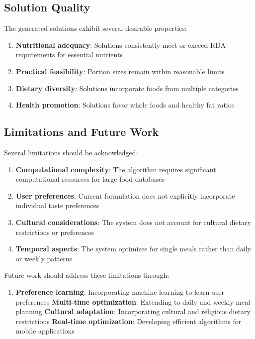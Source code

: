\documentclass[12pt,a4paper]{article}
\begin{document}
\subsection{Solution Quality}

The generated solutions exhibit several desirable properties:

\begin{enumerate}
    \item \textbf{Nutritional adequacy}: Solutions consistently meet or exceed RDA requirements for essential nutrients
    \item \textbf{Practical feasibility}: Portion sizes remain within reasonable limits
    \item \textbf{Dietary diversity}: Solutions incorporate foods from multiple categories
    \item \textbf{Health promotion}: Solutions favor whole foods and healthy fat ratios
\end{enumerate}

\subsection{Limitations and Future Work}

Several limitations should be acknowledged:

\begin{enumerate}
    \item \textbf{Computational complexity}: The algorithm requires significant computational resources for large food databases
    \item \textbf{User preferences}: Current formulation does not explicitly incorporate individual taste preferences
    \item \textbf{Cultural considerations}: The system does not account for cultural dietary restrictions or preferences
    \item \textbf{Temporal aspects}: The system optimizes for single meals rather than daily or weekly patterns
\end{enumerate}

Future work should address these limitations through:

\begin{enumerate}
    \item \textbf{Preference learning}: Incorporating machine learning to learn user preferences
    \textbf{Multi-time optimization}: Extending to daily and weekly meal planning
    \textbf{Cultural adaptation}: Incorporating cultural and religious dietary restrictions
    \textbf{Real-time optimization}: Developing efficient algorithms for mobile applications
\end{enumerate}
\end{document}
